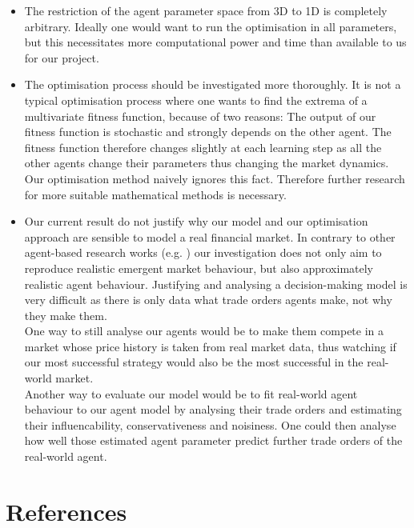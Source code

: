 \documentclass[11pt]{article}
\begin{document}
\begin{itemize}
  \item The restriction of the agent parameter space from 3D to 1D is completely arbitrary. Ideally one would want to run the optimisation in all parameters, but this necessitates more computational power and time than available to us for our project.
  \item The optimisation process should be investigated more thoroughly. It is not a typical optimisation process where one wants to find the extrema of a multivariate fitness function, because of two reasons: The output of our fitness function is stochastic and strongly depends on the other agent. The fitness function therefore changes slightly at each learning step as all the other agents change their parameters thus changing the market dynamics. Our optimisation method naively ignores this fact. Therefore further research for more suitable mathematical methods is necessary.
  \item Our current result do not justify why our model and our optimisation approach are sensible to model a real financial market. In contrary to other agent-based research works (e.g. \citet{raberto2001agent}) our investigation does not only aim to reproduce realistic emergent market behaviour, but also approximately realistic agent behaviour. Justifying and analysing a decision-making model is very difficult as there is only data what trade orders agents make, not why they make them. \\
  One way to still analyse our agents would be to make them compete in a market whose price history is taken from real market data, thus watching if our most successful strategy would also be the most successful in the real-world market. \\
  Another way to evaluate our model would be to fit real-world agent behaviour to our agent model by analysing their trade orders and estimating their influencability, conservativeness and noisiness. One could then analyse how well those estimated agent parameter predict further trade orders of the real-world agent.
\end{itemize}


\section{References}


\end{document}
